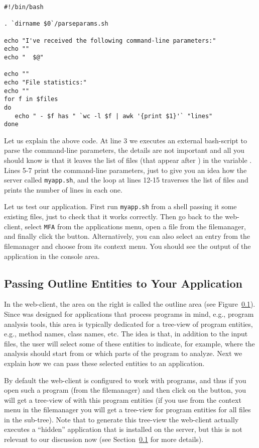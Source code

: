 \medskip
\begin{lstlisting}[style=script]
#!/bin/bash

. `dirname $0`/parseparams.sh

echo "I've received the following command-line parameters:"
echo ""
echo "  $@"

echo ""
echo "File statistics:"
echo ""
for f in $files 
do
   echo " - $f has " `wc -l $f | awk '{print $1}'` "lines"
done
\end{lstlisting}

\medskip
\noindent
Let us explain the above code. 
%
At line 3 we executes an external bash-script to parse the
command-line parameters, the details are not important and all you
should know is that it leaves the list of files (that appear after
) in the variable .
%
Lines 5-7 print the command-line parameters, just to give you an idea
how the server called \texttt{myapp.sh}, and the loop at lines 12-15
traverses the list of files and prints the number of lines in each
one.

Let us test our application. First run \texttt{myapp.sh} from a shell
passing it some existing files, just to check that it works correctly.
%
Then go back to the web-client, select \texttt{MFA} from the
applications menu, open a file from the filemanager, and finally click
the \applybutton button. Alternatively, you can also select an entry
from the filemanager and choose \applybutton from its context
menu. You should see the output of the application in the console
area.

\subsection{Passing Outline Entities to Your Application}

In the web-client, the area on the right is called the outline area
(see Figure~\ref{}).
%
Since \ei was designed for applications that process programs in mind,
e.g., program analysis tools, this area is typically dedicated for a
tree-view of program entities, e.g., method names, class names,
etc. 
%
The idea is that, in addition to the input files, the user will select
some of these entities to indicate, for example, where the analysis
should start from or which parts of the program to analyze.
%
Next we explain how we can pass these selected entities to an
application.

By default the web-client is configured to work with \abs programs,
and thus if you open such a program (from the filemanager) and then
click on the  button, you will get a tree-view of with
this program entities (if you use  from the context
menu in the filemanager you will get a tree-view for program entities
for all files in the sub-tree).
%
Note that to generate this tree-view the web-client actually executes a
``hidden'' application that is installed on the server, but this is
not relevant to our discussion now (see Section~\ref{} for more
details).

